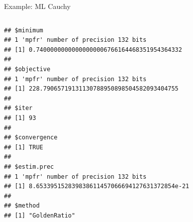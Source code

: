 \documentclass[11pt,compress,t,notes=noshow, xcolor=table]{beamer}
\begin{document}
\begin{vbframe}{Example: ML Cauchy}
\vspace*{-1cm}

\begin{columns}
\begin{column}{1\textwidth}
\begin{verbatim}
## $minimum
## 1 'mpfr' number of precision 132 bits
## [1] 0.74000000000000000006766164468351954364332
##
## $objective
## 1 'mpfr' number of precision 132 bits
## [1] 228.79065719131130788950898504582093404755
##
## $iter
## [1] 93
##
## $convergence
## [1] TRUE
##
## $estim.prec
## 1 'mpfr' number of precision 132 bits
## [1] 8.653395152839838611457066694127631372854e-21
##
## $method
## [1] "GoldenRatio"
\end{verbatim}

\end{column}
\end{columns}

\end{vbframe}
\endlecture
\end{document}
